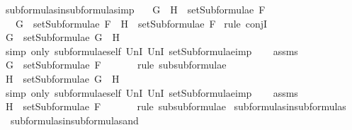 \begin{isabellebody}
{\isafoldproof}%
%
\isadelimproof
\isanewline
%
\endisadelimproof
\isanewline
{}\isamarkupfalse%
\ subformulas{\isacharunderscore}in{\isacharunderscore}subformulas{\isacharunderscore}imp{\isacharcolon}\isanewline
\ \ \ {\isachardoublequoteopen}G\ \isactrlbold {\isasymrightarrow}\ H\ {\isasymin}\ setSubformulae\ F{\isachardoublequoteclose}\ \isanewline
\ \ \ {\isachardoublequoteopen}G\ {\isasymin}\ setSubformulae\ F\ {\isasymand}\ H\ {\isasymin}\ setSubformulae\ F{\isachardoublequoteclose}\isanewline
%
\isadelimproof
%
\endisadelimproof
%
\isatagproof
{}\isamarkupfalse%
\ {\isacharparenleft}rule\ conjI{\isacharparenright}\isanewline
\ \ \isamarkupfalse%
\ {\isachardoublequoteopen}G\ {\isasymin}\ setSubformulae\ {\isacharparenleft}G\ \isactrlbold {\isasymrightarrow}\ H{\isacharparenright}{\isachardoublequoteclose}\ \isanewline
\ \ \ \ \isamarkupfalse%
\ {\isacharparenleft}simp\ only{\isacharcolon}\ subformulae{\isacharunderscore}self\ UnI{}\ UnI{}\ setSubformulae{\isacharunderscore}imp{\isacharparenright}\isanewline
\ \ \isamarkupfalse%
\ assms\ \isamarkupfalse%
\ {\isachardoublequoteopen}G\ {\isasymin}\ setSubformulae\ F{\isachardoublequoteclose}\ \isanewline
\ \ \ \ \isamarkupfalse%
\ {\isacharparenleft}rule\ subsubformulae{\isacharparenright}\isanewline
{}\isamarkupfalse%
\isanewline
\ \ \isamarkupfalse%
\ {\isachardoublequoteopen}H\ {\isasymin}\ setSubformulae\ {\isacharparenleft}G\ \isactrlbold {\isasymrightarrow}\ H{\isacharparenright}{\isachardoublequoteclose}\ \ \isanewline
\ \ \ \ \isamarkupfalse%
\ {\isacharparenleft}simp\ only{\isacharcolon}\ subformulae{\isacharunderscore}self\ UnI{}\ UnI{}\ setSubformulae{\isacharunderscore}imp{\isacharparenright}\isanewline
\ \ \isamarkupfalse%
\ assms\ \isamarkupfalse%
\ {\isachardoublequoteopen}H\ {\isasymin}\ setSubformulae\ F{\isachardoublequoteclose}\ \isanewline
\ \ \ \ \isamarkupfalse%
\ {\isacharparenleft}rule\ subsubformulae{\isacharparenright}\isanewline
{}\isamarkupfalse%
%
\endisatagproof
{\isafoldproof}%
%
\isadelimproof
\isanewline
%
\endisadelimproof
\isanewline
{}\isamarkupfalse%
\ subformulas{\isacharunderscore}in{\isacharunderscore}subformulas\ {\isacharequal}\isanewline
\ \ subformulas{\isacharunderscore}in{\isacharunderscore}subformulas{\isacharunderscore}and\isanewline

\end{isabellebody}
